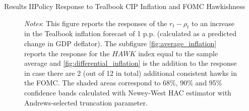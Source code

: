 \documentclass[11pt,pdf,aspectratio=129]{beamer}
\begin{document}
\begin{frame}{Results II}{Policy Response to Tealbook CIP Inflation and FOMC Hawkishness}
\begin{figure}[!htbp]
\begin{subfigure}[b]{0.48\textwidth}
        \end{subfigure}\vspace{-4ex}
            {\begin{flushleft}\tiny\textit{Notes}: This figure reports the responses of the $r_t-\rho_t$ to an increase in the Tealbook inflation forecast of 1 p.p. (calculated as a predicted change in GDP deflator). 
            The subfigure \ref{fig:average_inflation} reports the response for the $\mathit{HAWK}$ index equal to the sample average and \ref{fig:differential_inflation} is the addition to the response in case there are 2 (out of 12 in total) additional consistent hawks in the FOMC. The shaded areas correspond to 68\%, 90\% and 95\% confidence bands calculated with Newey-West HAC estimator with Andrews-selected truncation parameter.\end{flushleft}}
    \end{figure}
    
\end{frame}
\end{document}
